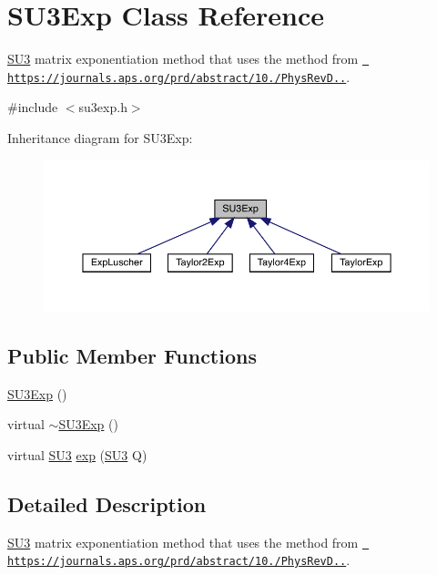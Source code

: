 \hypertarget{class_s_u3_exp}{}\section{S\+U3\+Exp Class Reference}
\label{class_s_u3_exp}


\mbox{\hyperlink{class_s_u3}{S\+U3}} matrix exponentiation method that uses the method from \href{https://journals.aps.org/prd/abstract/10.1103/PhysRevD.69.054501}{\texttt{ https\+://journals.\+aps.\+org/prd/abstract/10./\+Phys\+Rev\+D..}}.  




{\ttfamily \#include $<$su3exp.\+h$>$}



Inheritance diagram for S\+U3\+Exp\+:\nopagebreak
\begin{figure}[H]
\begin{center}
\leavevmode
\includegraphics[width=350pt]{class_s_u3_exp__inherit__graph}
\end{center}
\end{figure}
\subsection*{Public Member Functions}
\begin{DoxyCompactItemize}
\item 
\mbox{\hyperlink{class_s_u3_exp_a98afc0784d4b7fd89951ffa7d1209de6}{S\+U3\+Exp}} ()
\item 
virtual \mbox{\hyperlink{class_s_u3_exp_a68dc1c6cf615a08251d9976ca779b6ce}{$\sim$\+S\+U3\+Exp}} ()
\item 
virtual \mbox{\hyperlink{class_s_u3}{S\+U3}} \mbox{\hyperlink{class_s_u3_exp_a9760c17b9c3a4b6d0a5cd4d88c6d577e}{exp}} (\mbox{\hyperlink{class_s_u3}{S\+U3}} Q)
\end{DoxyCompactItemize}


\subsection{Detailed Description}
\mbox{\hyperlink{class_s_u3}{S\+U3}} matrix exponentiation method that uses the method from \href{https://journals.aps.org/prd/abstract/10.1103/PhysRevD.69.054501}{\texttt{ https\+://journals.\+aps.\+org/prd/abstract/10./\+Phys\+Rev\+D..}}. 

